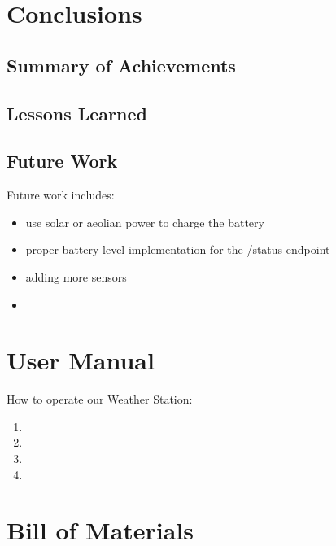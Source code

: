 \documentclass{article}
\begin{document}
\section{Conclusions}
    \subsection{Summary of Achievements}
    
    \subsection{Lessons Learned}
    \subsection{Future Work}
    Future work includes:
    \begin{itemize}
        \item use solar or aeolian power to charge the battery
        \item proper battery level implementation for the /status endpoint
        \item adding more sensors
        \item 
    \end{itemize}

\appendix

\section{User Manual}
How to operate our Weather Station:
\begin{enumerate}
  \item 
  \item 
  \item 
  \item 
\end{enumerate}

\section{Bill of Materials}
\end{document}
